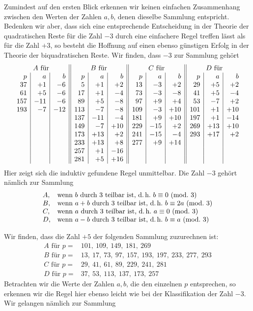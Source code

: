 %
Zumindest auf den ersten Blick erkennen wir keinen einfachen Zusammenhang zwischen den Werten der Zahlen $a,b$, denen dieselbe Sammlung entspricht. Bedenken wir aber, dass sich eine entsprechende Entscheidung in der Theorie der quadratischen Reste für die Zahl $-3$ durch eine einfachere Regel treffen lässt als für die Zahl $+3$, so besteht die Hoffnung auf einen ebenso günstigen Erfolg in der Theorie der biquadratischen Reste. Wir finden, dass $-3$ zur Sammlung gehört
\[
\begin{array}{r|r|r||r|r|r||r|r|r||r|r|r}
\multicolumn{3}{c||}{A\ \text{für}}&\multicolumn{3}{c||}{B\ \text{für}}&\multicolumn{3}{c||}{C\ \text{für}}&\multicolumn{3}{c}{D\ \text{für}}\\
p&a&b&p&a&b&p&a&b&p&a&b\\
37&+1&-6&5&+1&+2&13&-3&+2&29&+5&+2\\
61&+5&-6&17&+1&-4&73&-3&-8&41&+5&-4\\
157&-11&-6&89&+5&-8&97&+9&+4&53&-7&+2\\
193&-7&-12&113&-7&-8&109&-3&+10&101&+1&+10\\
&&&137&-11&-4&181&+9&+10&197&+1&-14\\
&&&149&-7&+10&229&-15&+2&269&+13&+10\\
&&&173&+13&+2&241&-15&-4&293&+17&+2\\
&&&233&+13&+8&277&+9&+14&&&\\
&&&257&+1&-16&&&&&&\\
&&&281&+5&+16&&&&&&
\end{array}
\]
Hier zeigt sich die induktiv gefundene Regel unmittelbar. Die Zahl $-3$ gehört nämlich zur Sammlung
\[
\begin{array}{ll}
A,&\text{wenn }b\text{ durch }3\text{ teilbar ist, d.\,h.\ }b\equiv0\ (\mathrm{mod.}\ 3)\\
B,&\text{wenn }a+b\text{ durch }3\text{ teilbar ist, d.\,h.\ }b\equiv2a\ (\mathrm{mod.}\ 3)\\
C,&\text{wenn }a\text{ durch }3\text{ teilbar ist, d.\,h.\ }a\equiv0\ (\mathrm{mod.}\ 3)\\
D,&\text{wenn }a-b\text{ durch }3\text{ teilbar ist, d.\,h.\ }b\equiv a\ (\mathrm{mod.}\ 3)
\end{array}
\]

Wir finden, dass die Zahl $+5$ der folgenden Sammlung zuzurechnen ist:
\[
\begin{array}{ll}
A\text{ für }p=&101,\ 109,\ 149,\ 181,\ 269\\
B\text{ für }p=&13,\ 17,\ 73,\ 97,\ 157,\ 193,\ 197,\ 233,\ 277,\ 293\\
C\text{ für }p=&29,\ 41,\ 61,\ 89,\ 229,\ 241,\ 281\\
D\text{ für }p=&37,\ 53,\ 113,\ 137,\ 173,\ 257
\end{array}
\]
Betrachten wir die Werte der Zahlen $a,b$, die den einzelnen $p$ entsprechen, so erkennen wir die Regel hier ebenso leicht wie bei der Klassifikation der Zahl $-3$. Wir gelangen nämlich zur Sammlung

